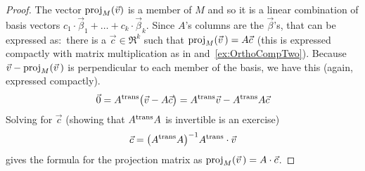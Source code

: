 \begin{proof}
The vector \( \proj{\vec{v}}{M} \) is a member of \( M \) and so it is a
linear combination of basis vectors
\( c_1\cdot\vec{\beta}_1+\dots+c_k\cdot\vec{\beta}_k \).
Since $A$'s columns are the $\vec{\beta}$'s, that can be expressed 
as:~there is a \( \vec{c}\in\Re^k \) such that
\( \proj{\vec{v}\,}{M}=A\vec{c} \)
(this is expressed compactly with matrix
multiplication as in
 and~\ref{ex:OrthoCompTwo}).
Because \( \vec{v}-\proj{\vec{v}\,}{M} \) is perpendicular to each member
of the basis, we have this (again, expressed compactly).
\begin{equation*}
  \zero
  =\trans{A}\bigl( \vec{v}-A\vec{c} \bigr) 
  =\trans{A}\vec{v}-\trans{A}A\vec{c}
\end{equation*}
Solving for \( \vec{c} \) (showing that \( \trans{A}A \) is invertible is an
exercise)
\begin{equation*}
  \vec{c}=\bigl( \trans{A}A\bigr)^{-1}\trans{A}\cdot\vec{v}
\end{equation*}
gives the formula for the projection matrix as 
$\proj{\vec{v}\,}{M}=A\cdot\vec{c}$.
\end{proof}

